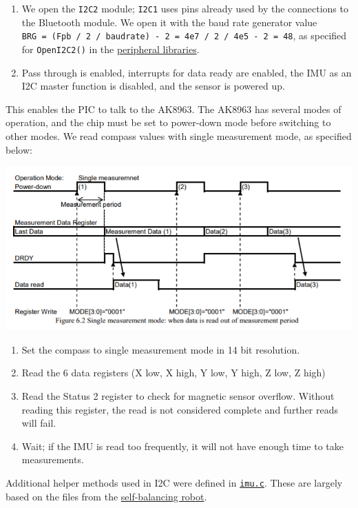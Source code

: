 \documentclass[]{article}
\providecommand{\tightlist}{%
  \setlength{\itemsep}{0pt}\setlength{\parskip}{0pt}}
\begin{document}
\begin{enumerate}
\def\labelenumi{\arabic{enumi}.}
\tightlist
\item
  We open the \texttt{I2C2} module; \texttt{I2C1} uses pins already used
  by the connections to the Bluetooth module. We open it with the baud
  rate generator value
  \texttt{BRG\ =\ (Fpb\ /\ 2\ /\ baudrate)\ -\ 2\ =\ 4e7\ /\ 2\ /\ 4e5\ -\ 2\ =\ 48},
  as specified for \texttt{OpenI2C2()} in the
  \protect\hyperlink{references}{peripheral libraries}.
\item
  Pass through is enabled, interrupts for data ready are enabled, the
  IMU as an I2C master function is disabled, and the sensor is powered
  up.
\end{enumerate}

This enables the PIC to talk to the AK8963. The AK8963 has several modes
of operation, and the chip must be set to power-down mode before
switching to other modes. We read compass values with single measurement
mode, as specified below:

\includegraphics{imu_single_measurement.png}

\begin{enumerate}
\def\labelenumi{\arabic{enumi}.}
\tightlist
\item
  Set the compass to single measurement mode in 14 bit resolution.
\item
  Read the 6 data registers (X low, X high, Y low, Y high, Z low, Z
  high)
\item
  Read the Status 2 register to check for magnetic sensor overflow.
  Without reading this register, the read is not considered complete and
  further reads will fail.
\item
  Wait; if the IMU is read too frequently, it will not have enough time
  to take measurements.
\end{enumerate}

Additional helper methods used in I2C were defined in
\href{generated/imu.c.html}{\texttt{imu.c}}. These are largely based on
the files from the
\protect\hyperlink{code-and-designs-borrowed-from-others}{self-balancing
robot}.
\end{document}
